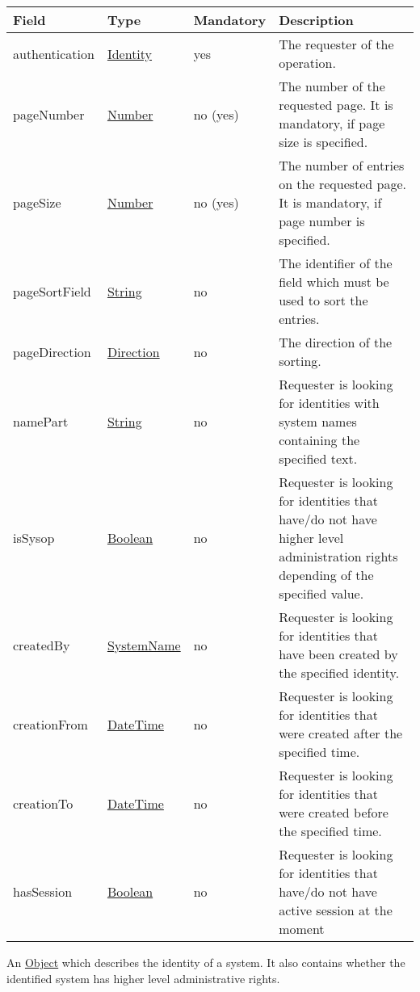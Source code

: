 \documentclass[a4paper]{arrowhead}
\newcommand{\pref}[1]{{\textcolor{ArrowheadGrey}{\hyperref[sec:model:primitives:#1]{#1}}}}
\begin{document}
{}

\begin{table}[ht!]
\begin{tabularx}{\textwidth}{| p{4.3cm} | p{4.8cm} | p{2cm} | X |} \hline
\rowcolor{gray!33} Field & Type & Mandatory & Description \\ \hline
authentication & \hyperref[sec:model:Identity]{Identity} & yes & The requester of the operation. \\ \hline
pageNumber & \pref{Number} & no (yes) & The number of the requested page. It is mandatory, if page size is specified. \\ \hline
pageSize & \pref{Number} & no (yes) & The number of entries on the requested page. It is mandatory, if page number is specified. \\ \hline
pageSortField & \pref{String} & no & The identifier of the field which must be used to sort the entries. \\ \hline
pageDirection & \pref{Direction} & no & The direction of the sorting. \\ \hline
namePart &  \pref{String} & no & Requester is looking for identities with system names containing the specified text. \\ \hline
isSysop & \pref{Boolean} & no & Requester is looking for identities that have/do not have higher level administration rights depending of the specified value. \\ \hline
createdBy & \pref{SystemName} & no & Requester is looking for identities that have been created by the specified identity. \\ \hline
creationFrom &  \pref{DateTime} & no & Requester is looking for identities that were created after the specified time. \\ \hline
creationTo &  \pref{DateTime} & no & Requester is looking for identities that were created before the specified time. \\ \hline
hasSession & \pref{Boolean} & no & Requester is looking for identities that have/do not have active session at the moment \\ \hline
\end{tabularx}
\end{table}


An \pref{Object} which describes the identity of a system. It also contains whether the identified system has higher level administrative rights.
\end{document}
